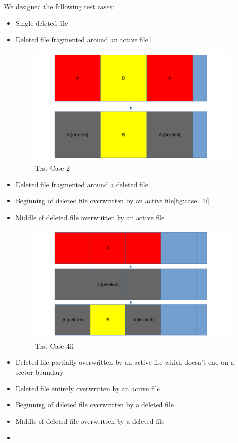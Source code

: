 We designed the following test cases:
\begin{itemize}
    \item [1] Single deleted file
    \item [2] Deleted file fragmented around an active file\ref{fig:case_2}
    \begin{figure}[h]
        \centering
        \includegraphics[width=\linewidth]{fig/case2.png}
        \caption{Test Case 2}
        \label{fig:case_2}
    \end{figure}
    \item [3]
 Deleted file fragmented around a deleted file
    \item [4i]
 Beginning of deleted file overwritten by an active file\ref{fig:case_4i}
    \item [4ii]
 Middle of deleted file overwritten by an active file
        \begin{figure}[h]
        \centering
        \includegraphics[width=\linewidth]{fig/case4ii.png}
        \caption{Test Case 4ii}
        \label{fig:case_4ii}
    \end{figure}
    \item [4iii]
 Deleted file partially overwritten by an active file which doesn't end on a sector boundary
    \item [4iv]
 Deleted file entirely overwritten by an active file
    \item [5i]
 Beginning of deleted file overwritten by a deleted file
    \item [5ii]
 Middle of deleted file overwritten by a deleted file
    \item [5iii]


\end{itemize}

